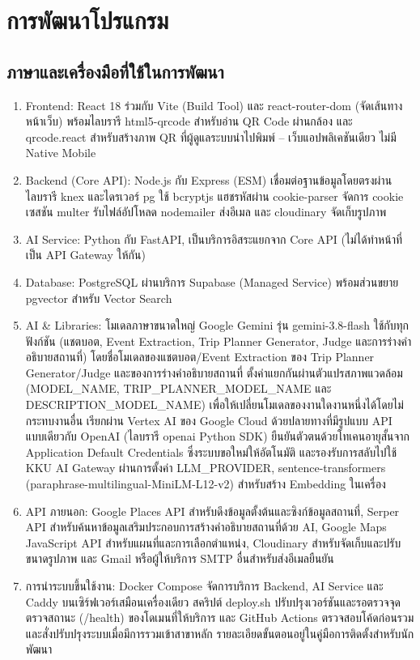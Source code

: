 \section{การพัฒนาโปรแกรม}

\subsection{ภาษาและเครื่องมือที่ใช้ในการพัฒนา}

\begin{enumerate}[label=(\arabic*),leftmargin=0pt,itemindent=\dimexpr\parindent+\parenlabelwidth+1em\relax,align=right,labelwidth=\parenlabelwidth,labelsep=1em]
\item Frontend: React 18 ร่วมกับ Vite (Build Tool) และ react-router-dom (จัดเส้นทางหน้าเว็บ) พร้อมไลบรารี html5-qrcode สำหรับอ่าน QR Code ผ่านกล้อง และ qrcode.react สำหรับสร้างภาพ QR ที่ผู้ดูแลระบบนำไปพิมพ์ -- เว็บแอปพลิเคชันเดียว ไม่มี Native Mobile
\item Backend (Core API): Node.js กับ Express (ESM) เชื่อมต่อฐานข้อมูลโดยตรงผ่านไลบรารี knex และไดรเวอร์ pg ใช้ bcryptjs แฮชรหัสผ่าน cookie-parser จัดการ cookie เซสชัน multer รับไฟล์อัปโหลด nodemailer ส่งอีเมล และ cloudinary จัดเก็บรูปภาพ
\item AI Service: Python กับ FastAPI, เป็นบริการอิสระแยกจาก Core API (ไม่ได้ทำหน้าที่เป็น API Gateway ให้กัน)
\item Database: PostgreSQL ผ่านบริการ Supabase (Managed Service) พร้อมส่วนขยาย pgvector สำหรับ Vector Search
\item AI \& Libraries: โมเดลภาษาขนาดใหญ่ Google Gemini รุ่น gemini-3.8-flash ใช้กับทุกฟังก์ชัน (แชตบอต, Event Extraction, Trip Planner Generator, Judge และการร่างคำอธิบายสถานที่) โดยชื่อโมเดลของแชตบอต/Event Extraction ของ Trip Planner Generator/Judge และของการร่างคำอธิบายสถานที่ ตั้งค่าแยกกันผ่านตัวแปรสภาพแวดล้อม (MODEL\_NAME, TRIP\_PLANNER\_MODEL\_NAME และ DESCRIPTION\_MODEL\_NAME) เพื่อให้เปลี่ยนโมเดลของงานใดงานหนึ่งได้โดยไม่กระทบงานอื่น เรียกผ่าน Vertex AI ของ Google Cloud ด้วยปลายทางที่มีรูปแบบ API แบบเดียวกับ OpenAI (ไลบรารี openai Python SDK) ยืนยันตัวตนด้วยโทเคนอายุสั้นจาก Application Default Credentials ซึ่งระบบขอใหม่ให้อัตโนมัติ และรองรับการสลับไปใช้ KKU AI Gateway ผ่านการตั้งค่า LLM\_PROVIDER, sentence-transformers (paraphrase-multilingual-MiniLM-L12-v2) สำหรับสร้าง Embedding ในเครื่อง
\item API ภายนอก: Google Places API สำหรับดึงข้อมูลตั้งต้นและซิงก์ข้อมูลสถานที่, Serper API สำหรับค้นหาข้อมูลเสริมประกอบการสร้างคำอธิบายสถานที่ด้วย AI, Google Maps JavaScript API สำหรับแผนที่และการเลือกตำแหน่ง, Cloudinary สำหรับจัดเก็บและปรับขนาดรูปภาพ และ Gmail หรือผู้ให้บริการ SMTP อื่นสำหรับส่งอีเมลยืนยัน
\item การนำระบบขึ้นใช้งาน: Docker Compose จัดการบริการ Backend, AI Service และ Caddy บนเซิร์ฟเวอร์เสมือนเครื่องเดียว สคริปต์ deploy.sh ปรับปรุงเวอร์ชันและรอตรวจจุดตรวจสถานะ (/health) ของโดเมนที่ให้บริการ และ GitHub Actions ตรวจสอบโค้ดก่อนรวมและสั่งปรับปรุงระบบเมื่อมีการรวมเข้าสาขาหลัก รายละเอียดขั้นตอนอยู่ในคู่มือการติดตั้งสำหรับนักพัฒนา
\end{enumerate}

